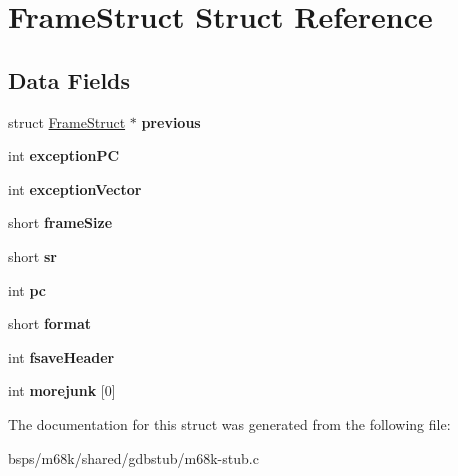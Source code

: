 \hypertarget{structFrameStruct}{}\section{Frame\+Struct Struct Reference}
\label{structFrameStruct}
\subsection*{Data Fields}
\begin{DoxyCompactItemize}
\item 
\mbox{\label{structFrameStruct_ac4d1bb18fbf444b92ca8e311630dd2e8}} 
struct \mbox{\hyperlink{structFrameStruct}{Frame\+Struct}} $\ast$ {\bfseries previous}
\item 
\mbox{\label{structFrameStruct_a94b07a5dff1237777616dad91e2d18d8}} 
int {\bfseries exception\+PC}
\item 
\mbox{\label{structFrameStruct_ae267f14774ce25d96d5977fb0c79151f}} 
int {\bfseries exception\+Vector}
\item 
\mbox{\label{structFrameStruct_a6fff77496ad1ac988585a4b1489a6fe2}} 
short {\bfseries frame\+Size}
\item 
\mbox{\label{structFrameStruct_abfe3a954de5a0bda1ab3a9fec6c47784}} 
short {\bfseries sr}
\item 
\mbox{\label{structFrameStruct_a72dadb32bd8049a760a381c5a2194048}} 
int {\bfseries pc}
\item 
\mbox{\label{structFrameStruct_a464803d699d9e1650e489e9ae7192621}} 
short {\bfseries format}
\item 
\mbox{\label{structFrameStruct_a795fcf65fdb2794508243b259785cb23}} 
int {\bfseries fsave\+Header}
\item 
\mbox{\label{structFrameStruct_a17c0d1938180ad87981335cce7543cc9}} 
int {\bfseries morejunk} \mbox{[}0\mbox{]}
\end{DoxyCompactItemize}


The documentation for this struct was generated from the following file\+:\begin{DoxyCompactItemize}
\item 
bsps/m68k/shared/gdbstub/m68k-\/stub.\+c\end{DoxyCompactItemize}
